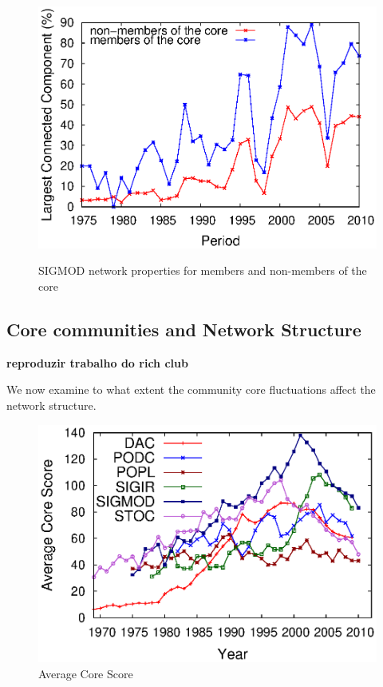 \begin{figure}[!htb]
\begin{center}
{    \includegraphics[scale=.33]{graficos/core_over_time/core_community/sigmod_janela_3_core_maior_componente_conectado.eps}
  }%
  \end{center}
  \caption{SIGMOD network properties for members and non-members of the core}
  \label{fig:metrics_comparing_core_community}
\end{figure}



\subsection{Core communities and Network Structure}
\label{sub:corr}


{\bf reproduzir trabalho do rich club \cite{Xu:2010}}

We now examine to what extent the community core fluctuations affect the network structure.

\begin{figure}[!htb]
\centering
\includegraphics[scale=.5]{graficos/average_core_score/average_core_score_slide_window_grupo_temporal_web.eps}
\caption{Average Core Score}
\label{fig:average_core_score}
\end{figure}





